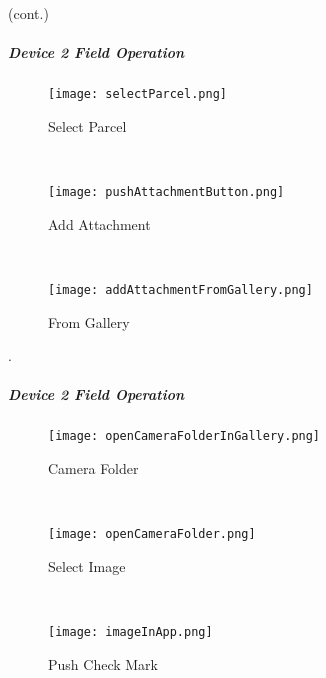 {\footnotesize (cont.)}
\vspace{.5in}


\clearpage
\subparagraph{Device 2 Field Operation}

\begin{wrapfigure}{r}{0.4\textwidth}
\centering
    \texttt{[image: selectParcel.png]}
\caption {Select Parcel}
\vspace{.05in}

\HRule \\[.4cm] %
\vspace{.1in}

    \texttt{[image: pushAttachmentButton.png]}
\caption{Add Attachment}
\vspace{.05in}

\HRule \\[.4cm] %
\vspace{.1in}

    \texttt{[image: addAttachmentFromGallery.png]}
\caption{From Gallery}
\end{wrapfigure}

.

\vspace{.5in}

\vspace{3in}

\vspace{3in}

\clearpage
\subparagraph*{Device 2 Field Operation}
\begin{wrapfigure}{r}{0.4\textwidth}
\centering
    \texttt{[image: openCameraFolderInGallery.png]}
\vspace{-.1in}

\caption {Camera Folder}
\vspace{.05in}

\HRule \\[.4cm] %
\vspace{.05in}

    \texttt{[image: openCameraFolder.png]}
\vspace{-.1in}

\caption{Select Image}
\vspace{.1in}

\HRule \\[.4cm] %
\vspace{.05in}

    \texttt{[image: imageInApp.png]}
\vspace{-.1in}

\caption{Push Check Mark}
\end{wrapfigure}

